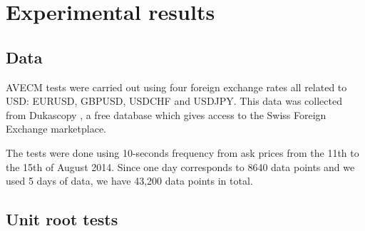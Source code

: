 \section{Experimental results}
\label{sec:results}
\subsection{Data} \label{sec:unitroot}
AVECM tests were carried out using four foreign exchange rates all related to
USD: EURUSD, GBPUSD, USDCHF and USDJPY. This data was collected from
Dukascopy \citep{Dukascopy2014}, a free database which gives access to the Swiss
Foreign Exchange marketplace.

The tests were done using 10-seconds frequency from ask prices from the 11th to
the 15th of August 2014. Since one day corresponds to 8640 data points and we
used 5 days of data, we have 43,200 data points in total.

\subsection{Unit root tests} \label{sec:unitroot}

